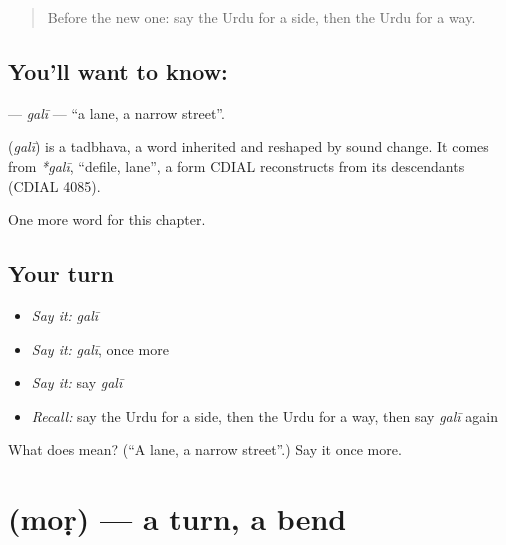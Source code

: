 \label{lesson:UR-C98-gali}



\begin{quote}
Before the new one: say the Urdu for a side, then the Urdu for a way.
\end{quote}

\subsection*{You'll want to know: }
\textbf{} — \emph{galī} — \textquotedblleft{}a lane, a narrow street\textquotedblright{}.

\begin{cousinweb}
\textbf{} (\emph{galī}) is a tadbhava, a word inherited and reshaped by sound change. It comes from \emph{*galī}, \textquotedblleft{}defile, lane\textquotedblright{}, a form CDIAL reconstructs from its descendants (CDIAL 4085).
\end{cousinweb}

\begin{grammarlens}[title={What you've built}]
One more word for this chapter.
\end{grammarlens}

\subsection*{Your turn}
\begin{itemize}
\raggedright
  \item \emph{Say it:} \emph{galī}
  \item \emph{Say it:} \emph{galī}, once more
  \item \emph{Say it:} say \emph{galī}
  \item \emph{Recall:} say the Urdu for a side, then the Urdu for a way, then say \emph{galī} again
\end{itemize}

\begin{tcolorbox}[breakable,colback=teal!4,colframe=teal!35!black,title={Before you move on}]
What does  mean? (\textquotedblleft{}A lane, a narrow street\textquotedblright{}.) Say it once more.
\end{tcolorbox}
\section[\texorpdfstring{\ur{موڑ} (moṛ)}{موڑ (moṛ)}]{ (moṛ) — a turn, a bend}

\label{lesson:UR-C98-mor}



